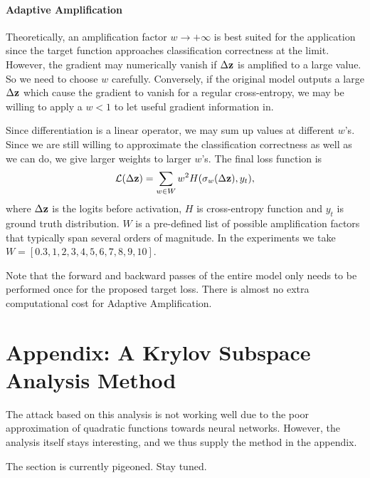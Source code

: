 \documentclass{paper}
\begin{document}
\paragraph{Adaptive Amplification} Theoretically, an amplification factor $w \to +\infty$ is best suited for the application since the target function approaches classification correctness at the limit. However, the gradient may numerically vanish if $\Delta \mathbf{z}$ is amplified to a large value. So we need to choose $w$ carefully. Conversely, if the original model outputs a large $\Delta \mathbf{z}$ which cause the gradient to vanish for a regular cross-entropy, we may be willing to apply a $w < 1$ to let useful gradient information in.

Since differentiation is a linear operator, we may sum up values at different $w$'s. Since we are still willing to approximate the classification correctness as well as we can do, we give larger weights to larger $w$'s. The final loss function is
\begin{equation}
    \mathcal{L}(\Delta \mathbf{z}) = \sum_{w \in W} w^2 H(\sigma_w(\Delta \mathbf{z}), y_t),
\end{equation}
where $\Delta \mathbf{z}$ is the logits before activation, $H$ is cross-entropy function and $y_t$ is ground truth distribution. $W$ is a pre-defined list of possible amplification factors that typically span several orders of magnitude. In the experiments we take $W = [0.3, 1, 2, 3, 4, 5, 6, 7, 8, 9, 10]$.

Note that the forward and backward passes of the entire model only needs to be performed once for the proposed target loss. There is almost no extra computational cost for Adaptive Amplification.

\section*{Appendix: A Krylov Subspace Analysis Method}

The attack based on this analysis is not working well due to the poor approximation of quadratic functions towards neural networks. However, the analysis itself stays interesting, and we thus supply the method in the appendix.

The section is currently pigeoned. Stay tuned.
\end{document}
